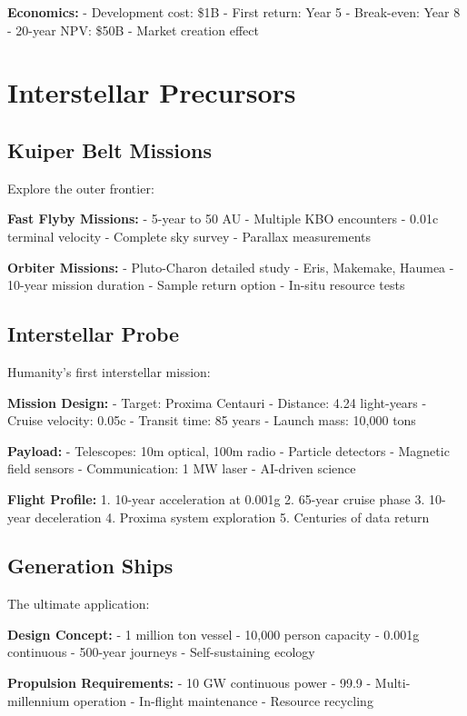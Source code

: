 \documentclass[12pt,letterpaper]{book}
\theoremstyle{definition}
\theoremstyle{plain}
\theoremstyle{remark}
\begin{document}
{{{{{\textbf{Economics:}
- Development cost: \$1B
- First return: Year 5
- Break-even: Year 8
- 20-year NPV: \$50B
- Market creation effect

\section{Interstellar Precursors}

\subsection{Kuiper Belt Missions}

Explore the outer frontier:

\textbf{Fast Flyby Missions:}
- 5-year to 50 AU
- Multiple KBO encounters
- 0.01c terminal velocity
- Complete sky survey
- Parallax measurements

\textbf{Orbiter Missions:}
- Pluto-Charon detailed study
- Eris, Makemake, Haumea
- 10-year mission duration
- Sample return option
- In-situ resource tests

\subsection{Interstellar Probe}

Humanity's first interstellar mission:

\textbf{Mission Design:}
- Target: Proxima Centauri
- Distance: 4.24 light-years
- Cruise velocity: 0.05c
- Transit time: 85 years
- Launch mass: 10,000 tons

\textbf{Payload:}
- Telescopes: 10m optical, 100m radio
- Particle detectors
- Magnetic field sensors
- Communication: 1 MW laser
- AI-driven science

\textbf{Flight Profile:}
1. 10-year acceleration at 0.001g
2. 65-year cruise phase
3. 10-year deceleration
4. Proxima system exploration
5. Centuries of data return

\subsection{Generation Ships}

The ultimate application:

\textbf{Design Concept:}
- 1 million ton vessel
- 10,000 person capacity
- 0.001g continuous
- 500-year journeys
- Self-sustaining ecology

\textbf{Propulsion Requirements:}
- 10 GW continuous power
- 99.9%
- Multi-millennium operation
- In-flight maintenance
- Resource recycling

}}}}}
\end{document}
